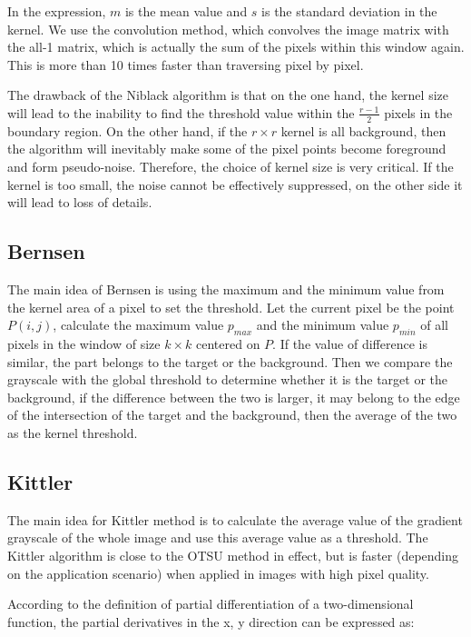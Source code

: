 \documentclass[hyperref]{article}
\theoremstyle{nonumberplain}
\begin{document}
	In the expression, $m$ is the mean value and $s$ is the standard deviation in the kernel. We use the convolution method, which convolves the image matrix with the all-1 matrix, which is actually the sum of the pixels within this window again. This is more than 10 times faster than traversing pixel by pixel.
	
	The drawback of the Niblack algorithm is that on the one hand, the kernel size will lead to the inability to find the threshold value within the $\frac{r-1}{2}$ pixels in the boundary region. On the other hand, if the $r \times r$ kernel is all background, then the algorithm will inevitably make some of the pixel points become foreground and form pseudo-noise. Therefore, the choice of kernel size is very critical. If the kernel is too small, the noise cannot be effectively suppressed, on the other side it will lead to loss of details.
	
	\subsection{Bernsen}
	
	\hspace{1.0em}
	The main idea of Bernsen is using the maximum and the minimum value from the kernel area of a pixel to set the threshold. Let the current pixel be the point $P(i,j)$, calculate the maximum value $p_{max}$ and the minimum value $p_{min}$ of all pixels in the window of size $k\times k$ centered on $P$. If the value of difference is similar, the part belongs to the target or the background. Then we compare the grayscale with the global threshold to determine whether it is the target or the background, if the difference between the two is larger, it may belong to the edge of the intersection of the target and the background, then the average of the two as the kernel threshold. 
	
	\subsection{Kittler}
	
	\hspace{1.0em}
	The main idea for Kittler method is to calculate the average value of the gradient grayscale of the whole image and use this average value as a threshold. The Kittler algorithm is close to the OTSU method in effect, but is faster (depending on the application scenario) when applied in images with high pixel quality.
	
	According to the definition of partial differentiation of a two-dimensional function, the partial derivatives in the x, y direction can be expressed as:
	
\end{document}
